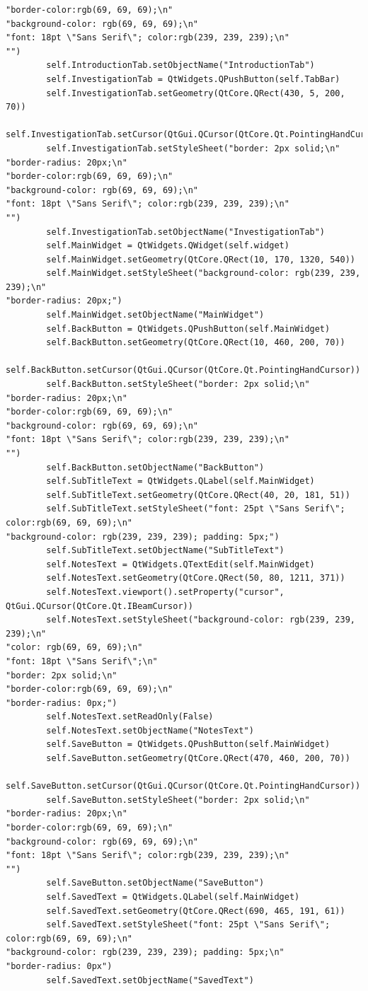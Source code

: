 \documentclass{article}
\begin{document}
\begin{lstlisting}
"border-color:rgb(69, 69, 69);\n"
"background-color: rgb(69, 69, 69);\n"
"font: 18pt \"Sans Serif\"; color:rgb(239, 239, 239);\n"
"")
        self.IntroductionTab.setObjectName("IntroductionTab")
        self.InvestigationTab = QtWidgets.QPushButton(self.TabBar)
        self.InvestigationTab.setGeometry(QtCore.QRect(430, 5, 200, 70))
        self.InvestigationTab.setCursor(QtGui.QCursor(QtCore.Qt.PointingHandCursor))
        self.InvestigationTab.setStyleSheet("border: 2px solid;\n"
"border-radius: 20px;\n"
"border-color:rgb(69, 69, 69);\n"
"background-color: rgb(69, 69, 69);\n"
"font: 18pt \"Sans Serif\"; color:rgb(239, 239, 239);\n"
"")
        self.InvestigationTab.setObjectName("InvestigationTab")
        self.MainWidget = QtWidgets.QWidget(self.widget)
        self.MainWidget.setGeometry(QtCore.QRect(10, 170, 1320, 540))
        self.MainWidget.setStyleSheet("background-color: rgb(239, 239, 239);\n"
"border-radius: 20px;")
        self.MainWidget.setObjectName("MainWidget")
        self.BackButton = QtWidgets.QPushButton(self.MainWidget)
        self.BackButton.setGeometry(QtCore.QRect(10, 460, 200, 70))
        self.BackButton.setCursor(QtGui.QCursor(QtCore.Qt.PointingHandCursor))
        self.BackButton.setStyleSheet("border: 2px solid;\n"
"border-radius: 20px;\n"
"border-color:rgb(69, 69, 69);\n"
"background-color: rgb(69, 69, 69);\n"
"font: 18pt \"Sans Serif\"; color:rgb(239, 239, 239);\n"
"")
        self.BackButton.setObjectName("BackButton")
        self.SubTitleText = QtWidgets.QLabel(self.MainWidget)
        self.SubTitleText.setGeometry(QtCore.QRect(40, 20, 181, 51))
        self.SubTitleText.setStyleSheet("font: 25pt \"Sans Serif\"; color:rgb(69, 69, 69);\n"
"background-color: rgb(239, 239, 239); padding: 5px;")
        self.SubTitleText.setObjectName("SubTitleText")
        self.NotesText = QtWidgets.QTextEdit(self.MainWidget)
        self.NotesText.setGeometry(QtCore.QRect(50, 80, 1211, 371))
        self.NotesText.viewport().setProperty("cursor", QtGui.QCursor(QtCore.Qt.IBeamCursor))
        self.NotesText.setStyleSheet("background-color: rgb(239, 239, 239);\n"
"color: rgb(69, 69, 69);\n"
"font: 18pt \"Sans Serif\";\n"
"border: 2px solid;\n"
"border-color:rgb(69, 69, 69);\n"
"border-radius: 0px;")
        self.NotesText.setReadOnly(False)
        self.NotesText.setObjectName("NotesText")
        self.SaveButton = QtWidgets.QPushButton(self.MainWidget)
        self.SaveButton.setGeometry(QtCore.QRect(470, 460, 200, 70))
        self.SaveButton.setCursor(QtGui.QCursor(QtCore.Qt.PointingHandCursor))
        self.SaveButton.setStyleSheet("border: 2px solid;\n"
"border-radius: 20px;\n"
"border-color:rgb(69, 69, 69);\n"
"background-color: rgb(69, 69, 69);\n"
"font: 18pt \"Sans Serif\"; color:rgb(239, 239, 239);\n"
"")
        self.SaveButton.setObjectName("SaveButton")
        self.SavedText = QtWidgets.QLabel(self.MainWidget)
        self.SavedText.setGeometry(QtCore.QRect(690, 465, 191, 61))
        self.SavedText.setStyleSheet("font: 25pt \"Sans Serif\"; color:rgb(69, 69, 69);\n"
"background-color: rgb(239, 239, 239); padding: 5px;\n"
"border-radius: 0px")
        self.SavedText.setObjectName("SavedText")


\end{lstlisting}
\end{document}
